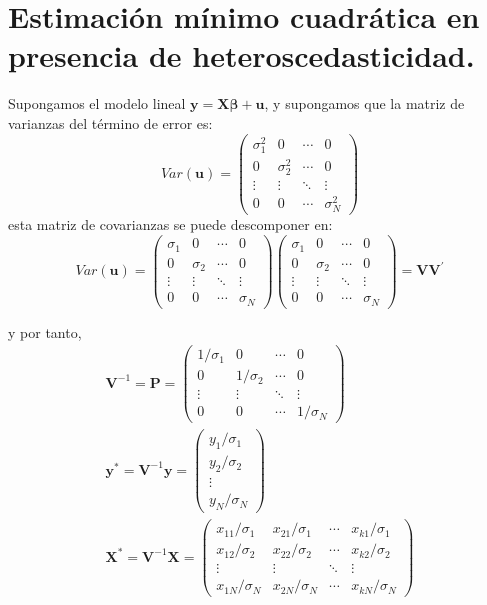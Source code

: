 \section{Estimaci\'on m\'inimo cuadr\'atica en presencia de heteroscedasticidad.}

Supongamos el modelo lineal $\boldsymbol{y}=\boldsymbol{X}\boldsymbol{\beta}+\boldsymbol{u}$,
y supongamos que la matriz de varianzas del t\'ermino de error es:
\[
Var\left(\boldsymbol{u}\right)=\left(\begin{array}{cccc}
\sigma_{1}^{2} & 0 & \cdots & 0\\
0 & \sigma_{2}^{2} & \cdots & 0\\
\vdots & \vdots & \ddots & \vdots\\
0 & 0 & \cdots & \sigma_{N}^{2}
\end{array}\right)
\]
 esta matriz de covarianzas se puede descomponer en:
\[
Var\left(\boldsymbol{u}\right)=\left(\begin{array}{cccc}
\sigma_{1} & 0 & \cdots & 0\\
0 & \sigma_{2} & \cdots & 0\\
\vdots & \vdots & \ddots & \vdots\\
0 & 0 & \cdots & \sigma_{N}
\end{array}\right)\left(\begin{array}{cccc}
\sigma_{1} & 0 & \cdots & 0\\
0 & \sigma_{2} & \cdots & 0\\
\vdots & \vdots & \ddots & \vdots\\
0 & 0 & \cdots & \sigma_{N}
\end{array}\right)=\boldsymbol{V}\boldsymbol{V}^{\prime}
\]


y por tanto, 
\[
\begin{array}{c}
\boldsymbol{V}^{-1}=\boldsymbol{P}=\left(\begin{array}{cccc}
1/\sigma_{1} & 0 & \cdots & 0\\
0 & 1/\sigma_{2} & \cdots & 0\\
\vdots & \vdots & \ddots & \vdots\\
0 & 0 & \cdots & 1/\sigma_{N}
\end{array}\right)\\
\boldsymbol{y}^{*}=\boldsymbol{V}^{-1}\boldsymbol{y}=\left(\begin{array}{c}
y_{1}/\sigma_{1}\\
y_{2}/\sigma_{2}\\
\vdots\\
y_{N}/\sigma_{N}
\end{array}\right)\\
\boldsymbol{X}^{*}=\boldsymbol{V}^{-1}\boldsymbol{X}=\left(\begin{array}{cccc}
x_{11}/\sigma_{1} & x_{21}/\sigma_{1} & \cdots & x_{k1}/\sigma_{1}\\
x_{12}/\sigma_{2} & x_{22}/\sigma_{2} & \cdots & x_{k2}/\sigma_{2}\\
\vdots & \vdots & \ddots & \vdots\\
x_{1N}/\sigma_{N} & x_{2N}/\sigma_{N} & \cdots & x_{kN}/\sigma_{N}
\end{array}\right)
\end{array}
\]


